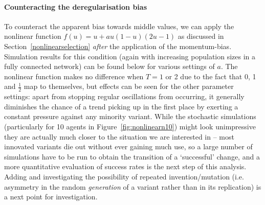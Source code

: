 \begin{knitrout}
\color{fgcolor}\begin{kframe}


{\ttfamily\noindent\bfseries{}}\end{kframe}
\end{knitrout}

\begin{knitrout}
\color{fgcolor}\begin{kframe}


{\ttfamily\noindent\bfseries\color{errorcolor}{\#\# Error in (function (T, x) : unused argument (0.05)}}\end{kframe}
\end{knitrout}

\begin{knitrout}
\color{fgcolor}\begin{kframe}


{\ttfamily\noindent\bfseries\color{errorcolor}{\#\# Error in (function (T, x) : unused argument (0.05)}}\end{kframe}
\end{knitrout}

\paragraph{Counteracting the deregularisation bias}

To counteract the apparent bias towards middle values, we can apply the nonlinear function $f(u)=u+au(1-u)(2u-1)$ as discussed in Section~\ref{nonlinearselection} \emph{after} the application of the momentum-bias. Simulation results for this condition (again with increasing population sizes in a fully connected network) can be found below for various settings of $a$. The nonlinear function makes no difference when $T=1$ or 2 due to the fact that 0, 1 and $\frac{1}{2}$ map to themselves, but effects can be seen for the other parameter settings: apart from stopping regular oscillations from occurring, it generally diminishes the chance of a trend picking up in the first place by exerting a constant pressure against any minority variant. While the stochastic simulations (particularly for 10 agents in Figure~\ref{fig:nonlinearn10}) might look unimpressive they are actually much closer to the situation we are interested in -- most innovated variants die out without ever gaining much use, so a large number of simulations have to be run to obtain the transition of a `successful' change, and a more quantitative evaluation of success rates is the next step of this analysis. Adding and investigating the possibility of repeated invention/mutation (i.e. asymmetry in the random \emph{generation} of a variant rather than in its replication) is a next point for investigation.

